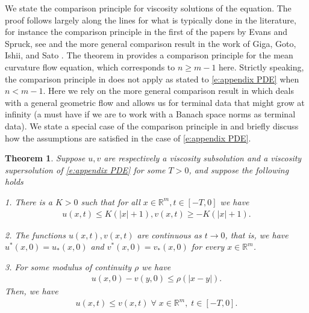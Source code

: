 \documentclass[reqno]{amsart}
\newtheorem{theorem}{Theorem}[section]
\numberwithin{equation}{section}
\begin{document}
We state the comparison principle for viscosity solutions of the equation. The proof follows largely along the lines for what is typically done in the literature, for instance the comparison principle in the first of the papers by Evans and Spruck, see \cite[Theorem 3.2]{EvansSpruck1991} and the more general comparison result in the work of Giga, Goto, Ishii, and Sato \cite{GigaGotoIshiiSato1991}. The theorem in \cite{EvansSpruck1991} provides a comparison principle for the mean curvature flow equation, which corresponds to $n\geq m-1$ here. Strictly speaking, the comparison principle in \cite{EvansSpruck1991} does not apply as stated to \eqref{e:appendix PDE} when $n<m-1$. Here we rely on the more general comparison result in \cite{GigaGotoIshiiSato1991} which deals with a general geometric flow and allows us for terminal data that might grow at infinity (a must have if we are to work with a Banach space norms as terminal data). We state a special case of the comparison principle in \cite{GigaGotoIshiiSato1991} and briefly discuss how the assumptions are satisfied in the case of \eqref{e:appendix PDE}.
 
\begin{theorem}\label{t:comparison principle} Suppose $u,v$ are respectively a viscosity subsolution and a viscosity supersolution of \eqref{e:appendix PDE} for some $T>0$, and suppose the following holds

1. There is a $K>0$ such that for all $x\in\mathbb{R}^m, t\in [-T,0]$ we have
\begin{align*}
  u(x,t) \leq K(|x|+1), v(x,t) \geq -K(|x|+1).    
\end{align*}

2. The functions $u(x,t),v(x,t)$ are continuous as $t\to 0$, that is, we have $u^*(x,0)=u_*(x,0)$ and $v^*(x,0)=v_*(x,0)$ for every $x \in \mathbb{R}^m$.

3. For some modulus of continuity $\rho$ we have
\begin{align*}
  u(x,0)-v(y,0) \leq \rho(|x-y|).    
\end{align*}
Then, we have
\begin{align*}
  u(x,t) \leq v(x,t) \;\forall\;x\in\mathbb{R}^m,\;t\in[-T,0].    
\end{align*}
    
\end{theorem}
\end{document}
